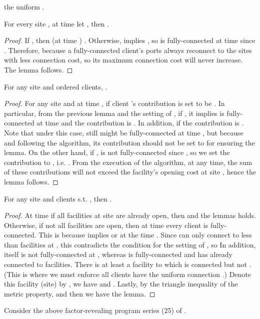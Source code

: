\documentclass[10pt]{llncs}
\begin{document}
the uniform .
\begin{lemma}
For every site , at time  
let , then .\label{lem:r}\end{lemma}
\begin{proof}
If , then 
(at time ) . Otherwise,
 implies , so 
is fully-connected at time  since . Therefore,
 because a fully-connected
client's ports always reconnect to the sites with less connection
cost, so its maximum connection cost will never increase. The lemma
follows.\end{proof}
\begin{lemma}
For any site  and ordered  clients, \linebreak{}
.\label{lem:contri}\end{lemma}
\begin{proof}
For any site  and at time , if  client
's contribution is set to be .
In particular, from the previous lemma and the setting of ,
if , it implies  is fully-connected at time
 and the contribution is .
In addition, if  the contribution is .
Note that under this case,  still might be fully-connected at
time , but because  and following the algorithm,
its contribution should not be set to 
for ensuring the lemma. On the other hand, if ,  is
not fully-connected since , so we set the contribution
to , i.e. .
From the execution of the algorithm, at any time, the sum of these
contributions will not exceed the facility's opening cost at site
, hence the lemma follows.\end{proof}
\begin{lemma}
For any site  and clients  s.t. 
, then .\label{lem:tri}\end{lemma}
\begin{proof}
At time  if all facilities at site  are already
open, then  and the lemmas holds. Otherwise, if
not all facilities are open, then at time  every client 
is fully-connected. This is because  implies 
or  at the time . Since  can only connect
to less than  facilities at , this contradicts the condition
 for the setting of , so 
In addition,  itself is not fully-connected at , whereas 
is fully-connected and has already connected to  facilities. There
is at least a facility to which  is connected but not . (This
is where we must enforce all clients have the uniform connection .)
Denote this facility (site) by , we have 
and . Lastly, by the triangle inequality
of the metric property,  and then
we have the lemma.
\end{proof}
{\small 

}Consider the above factor-revealing program series (25) of \cite{Jain03dualfitting}.
\end{document}
